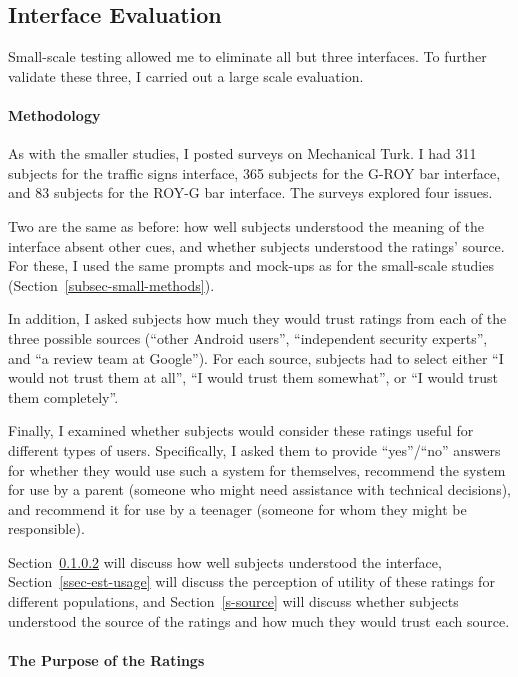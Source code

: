 \documentclass[11pt]{article}
\newcommand{\refsec}[1]{Section~\ref{#1}}
\begin{document}
\subsection{Interface Evaluation}
\label{s-sec-largescale}

Small-scale testing allowed me to eliminate all but three interfaces. 
To further validate these three, I carried out a large scale evaluation.

\paragraph{Methodology}
\label{subsec-large-methods}

As with the smaller studies, I posted surveys on Mechanical
Turk. I had 311 subjects for the traffic signs interface, 365
subjects for the G-ROY bar interface, and 83 subjects for the ROY-G bar
interface. The surveys explored four issues. 

Two are the same
as before: how well subjects understood the meaning of the interface
absent other cues, and whether subjects understood the ratings' source.
For these, I used the same prompts and mock-ups as for the
small-scale studies (\refsec{subsec-small-methods}).

In addition, I asked 
subjects how much they would trust ratings from each
of the three possible sources (``other Android users'', 
``independent security experts'', and ``a review team at Google''). 
For each source, subjects
had to select either ``I would not trust them at all'',
``I would trust them somewhat'', or ``I would trust 
them completely''.

Finally, I examined whether subjects would consider
these ratings useful for different types of users.
Specifically, I asked them to
provide ``yes''/``no'' answers for whether they would 
use such a system for themselves, recommend the system for use by a
parent (someone who might need assistance with technical decisions), and 
recommend it for use
by a teenager (someone for whom they might be
responsible).

\refsec{subsec-subject-understanding} will discuss how well
subjects understood the interface, \refsec{ssec-est-usage} will 
discuss the perception of utility of these ratings for different
populations, and \refsec{s-source} will discuss whether subjects 
understood the source of the ratings and how much they would trust each source.

\paragraph{The Purpose of the Ratings}
\label{subsec-subject-understanding}
\end{document}
